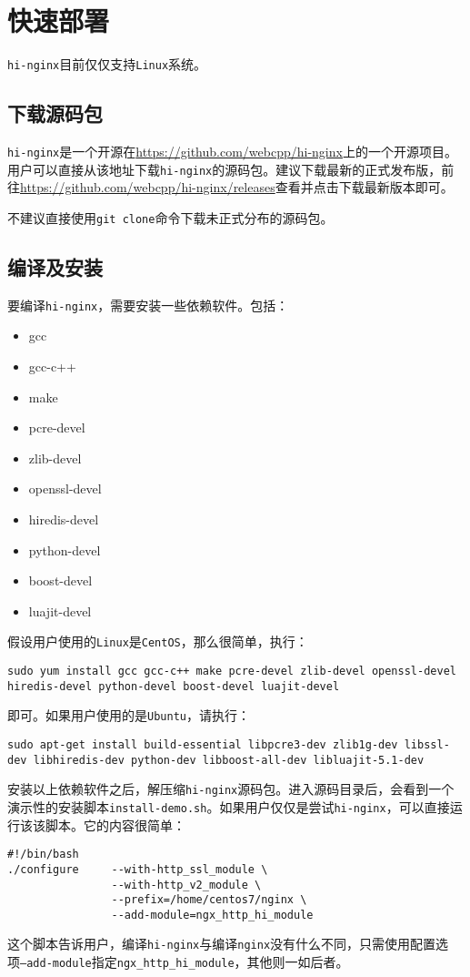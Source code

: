 \section{快速部署}
\texttt{hi-nginx}目前仅仅支持\texttt{Linux}系统。

\subsection{下载源码包}
\texttt{hi-nginx}是一个开源在\url{https://github.com/webcpp/hi-nginx}上的一个开源项目。用户可以直接从该地址下载\texttt{hi-nginx}的源码包。建议下载最新的正式发布版，前往\url{https://github.com/webcpp/hi-nginx/releases}查看并点击下载最新版本即可。

不建议直接使用\texttt{git clone}命令下载未正式分布的源码包。

\subsection{编译及安装}
要编译\texttt{hi-nginx}，需要安装一些依赖软件。包括：
\begin{itemize}
\item gcc
\item gcc-c++
\item make
\item pcre-devel
\item zlib-devel
\item openssl-devel
\item hiredis-devel
\item python-devel
\item boost-devel
\item luajit-devel
\end{itemize}
假设用户使用的\texttt{Linux}是\texttt{CentOS}，那么很简单，执行：
\begin{lstlisting}
sudo yum install gcc gcc-c++ make pcre-devel zlib-devel openssl-devel hiredis-devel python-devel boost-devel luajit-devel
\end{lstlisting}
即可。如果用户使用的是\texttt{Ubuntu}，请执行：
\begin{lstlisting}
sudo apt-get install build-essential libpcre3-dev zlib1g-dev libssl-dev libhiredis-dev python-dev libboost-all-dev libluajit-5.1-dev 
\end{lstlisting}

安装以上依赖软件之后，解压缩\texttt{hi-nginx}源码包。进入源码目录后，会看到一个演示性的安装脚本\texttt{install-demo.sh}。如果用户仅仅是尝试\texttt{hi-nginx}，可以直接运行该该脚本。它的内容很简单：
\begin{lstlisting}
#!/bin/bash
./configure     --with-http_ssl_module \
                --with-http_v2_module \
                --prefix=/home/centos7/nginx \
                --add-module=ngx_http_hi_module
\end{lstlisting}
这个脚本告诉用户，编译\texttt{hi-nginx}与编译\texttt{nginx}没有什么不同，只需使用配置选项\texttt{--add-module}指定\texttt{ngx_http_hi_module}，其他则一如后者。

